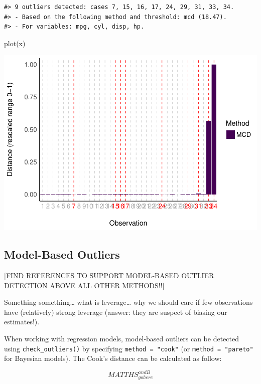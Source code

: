\documentclass[
]{article}
\newenvironment{Shaded}{\begin{snugshade}}{\end{snugshade}}
\newcommand{\FunctionTok}[1]{\textcolor[rgb]{0.00,0.00,0.00}{#1}}
\newcommand{\NormalTok}[1]{#1}
\begin{document}
\begin{verbatim}
#> 9 outliers detected: cases 7, 15, 16, 17, 24, 29, 31, 33, 34.
#> - Based on the following method and threshold: mcd (18.47).
#> - For variables: mpg, cyl, disp, hp.
\end{verbatim}

\begin{Shaded}
\begin{Highlighting}[]
\FunctionTok{plot}\NormalTok{(x)}
\end{Highlighting}
\end{Shaded}

\includegraphics[width=1\linewidth]{paper_files/figure-latex/multivariate outliers-1}

\hypertarget{model-based-outliers}{%
\subsection{Model-Based Outliers}\label{model-based-outliers}}

{[}FIND REFERENCES TO SUPPORT MODEL-BASED OUTLIER DETECTION ABOVE ALL
OTHER METHODS!!{]}

Something something\ldots{} what is leverage\ldots{} why we should care
if few observations have (relatively) strong leverage (answer: they are
suspect of biasing our estimates!).

When working with regression models, model-based outliers can be
detected using \texttt{check\_outliers()} by specifying
\texttt{method\ =\ "cook"} (or \texttt{method\ =\ "pareto"} for Bayesian
models). The Cook's distance can be calculated as follow:

\[
MATTHS_{gohere}^{andB}
\]
\end{document}
